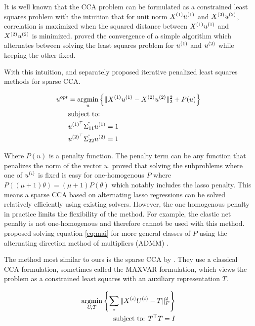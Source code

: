 It is well known that the CCA problem can be formulated as a constrained least squares problem with the intuition that
for unit norm \(X^{(1)} u^{(1)}\) and \(X^{(2)} u^{(2)}\), correlation is maximized when the squared distance
between \(X^{(1)} u^{(1)}\) and \(X^{(2)} u^{(2)}\) is minimized. \citep{golub1995canonical} proved the
convergence of a simple algorithm which alternates between solving the least squares problem for \(u^{(1)}\) and
\(u^{(2)}\) while keeping the other fixed.

With this intuition, \citep{wilms2015sparse} and \citep{mai2019iterative} separately proposed iterative penalized least
squares methods for sparse CCA.

\begin{align}
    \label{eq:mai}
    u^{opt} &= \underset{u}{\mathrm{argmin}} \left\{ \|X^{(1)}u^{(1)} - X^{(2)}u^{(2)}\|_2^2 + P(u) \right\} \\
    &\text{subject to:} \notag \\
    &u^{(1)^{\top}} \hat{\Sigma_{11}} u^{(1)}=1 \notag \\
    &u^{(2)^{\top}} \hat{\Sigma_{22}} u^{(2)}=1 \notag
\end{align}

Where \(P(u)\) is a penalty function.
The penalty term can be any function that penalizes the norm of the vector \(u\).
\citep{mai2019iterative} proved that solving the subproblems where one of $u^{(i)}$ is fixed is easy for one-homogenous $P$ where
\( P((\mu + 1)\theta) = (\mu + 1)P(\theta) \) which notably includes the lasso penalty.
This means a sparse CCA based
on alternating lasso regressions can be solved relatively efficiently using existing solvers.
However, the one homogenous penalty in practice limits the flexibility of the method.
For example, the elastic net penalty is not one-homogenous and therefore cannot be used with this method.\citep{
    kanatsoulis2018structured} proposed solving equation \ref{eq:mai} for more general classes of $P$ using the
alternating direction method of multipliers (ADMM) \citep{boyd2011distributed}.

The method most similar to ours is the sparse CCA by \citep{fu2017scalable}.
They use a classical CCA formulation, sometimes called the MAXVAR formulation, which views the problem as a constrained least squares with an auxiliary representation $T$\citep{carroll1968generalization,kettenring1971canonical}.


\begin{align}\label{eq:fu}
    \underset{U, T}{\mathrm{argmin}}\left\{\sum_i \|X^{(i)} U^{(i)} - T\|_F^2\right\}\\
    \text{subject to: }T^\top T = I\\
\end{align}

